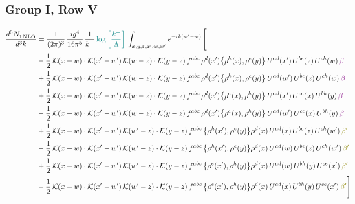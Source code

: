 \documentclass[9pt]{article}
\numberwithin{equation}{section}
\begin{document}
\subsubsection{Group I, Row V}
\begin{align}
    \frac{d^{3}N_{1\,\rm NLO}^{\rm}}{d^{3}k}  & = \frac{1}{(2\pi)^{3}}\, \frac{ig^{4}}{16\pi^{5}}\, \frac{1}{k^{+}}\, {\color{teal}\log{\left[\frac{k^{+}}{\Lambda}\right]}}\,\int_{x,y,z,x^{\prime},w,w^{\prime}}e^{-ik(w^{\prime}-w)}\, \Bigg[\notag \\ & -\frac{1}{2}\,\mathcal{K}(x-w)\cdot\mathcal{K}(x'-w')\,\mathcal{K}(w-z)\cdot\mathcal{K}(y-z)\, f^{abc}\,\rho^{d}(x')\big\{\rho^{h}(x),\rho^{e}(y)\big\}\,U^{ad}(x')\,U^{be}(z)\,U^{ch}(w)\,{\color{violet} \beta}\notag\\ & +\frac{1}{2}\,\mathcal{K}(x-w)\cdot\mathcal{K}(x'-w')\,\mathcal{K}(w-z)\cdot\mathcal{K}(y-z)\, f^{abc}\,\rho^{d}(x')\big\{\rho^{h}(x),\rho^{e}(y)\big\}\,U^{ad}(w')\,U^{be}(z)\,U^{ch}(w)\,{\color{violet} \beta}\notag\\ &+\frac{1}{2}\,\mathcal{K}(x-w)\cdot\mathcal{K}(x'-w')\,\mathcal{K}(w-z)\cdot\mathcal{K}(y-z)\, f^{abc}\,\rho^{d}(x')\big\{\rho^{e}(x),\rho^{h}(y)\big\}\,U^{ad}(x')\,U^{ce}(x)\,U^{bh}(y)\,{\color{violet} \beta}\notag\\ & -\frac{1}{2}\,\mathcal{K}(x-w)\cdot\mathcal{K}(x'-w')\,\mathcal{K}(w-z)\cdot\mathcal{K}(y-z)\, f^{abc}\,\rho^{d}(x')\big\{\rho^{e}(x),\rho^{h}(y)\big\}\,U^{ad}(w')\,U^{ce}(x)\,U^{bh}(y)\,{\color{violet} \beta}\notag\\ & +\frac{1}{2}\,\mathcal{K}(x-w)\cdot\mathcal{K}(x'-w')\,\mathcal{K}(w'-z)\cdot\mathcal{K}(y-z)\, f^{abc}\,\big\{\rho^{h}(x'),\rho^{e}(y)\big\}\rho^{d}(x)\,U^{ad}(x)\,U^{be}(z)\,U^{ch}(w')\,{\color{olive} \beta'}\notag\\ &-\frac{1}{2}\,\mathcal{K}(x-w)\cdot\mathcal{K}(x'-w')\,\mathcal{K}(w'-z)\cdot\mathcal{K}(y-z)\, f^{abc}\,\big\{\rho^{h}(x'),\rho^{e}(y)\big\}\rho^{d}(x)\,U^{ad}(w)\,U^{be}(z)\,U^{ch}(w')\,{\color{olive} \beta'}\notag\\ & +\frac{1}{2}\,\mathcal{K}(x-w)\cdot\mathcal{K}(x'-w')\,\mathcal{K}(w'-z)\cdot\mathcal{K}(y-z)\, f^{abc}\,\big\{\rho^{e}(x'),\rho^{h}(y)\big\}\rho^{d}(x)\,U^{ad}(w)\,U^{bh}(y)\,U^{ce}(x')\,{\color{olive} \beta'}\notag\\ &-\frac{1}{2}\,\mathcal{K}(x-w)\cdot\mathcal{K}(x'-w')\,\mathcal{K}(w'-z)\cdot\mathcal{K}(y-z)\, f^{abc}\,\big\{\rho^{e}(x'),\rho^{h}(y)\big\}\rho^{d}(x)\,U^{ad}(x)\,U^{bh}(y)\,U^{ce}(x')\,{\color{olive} \beta'} \Bigg]
\end{align}
\end{document}
